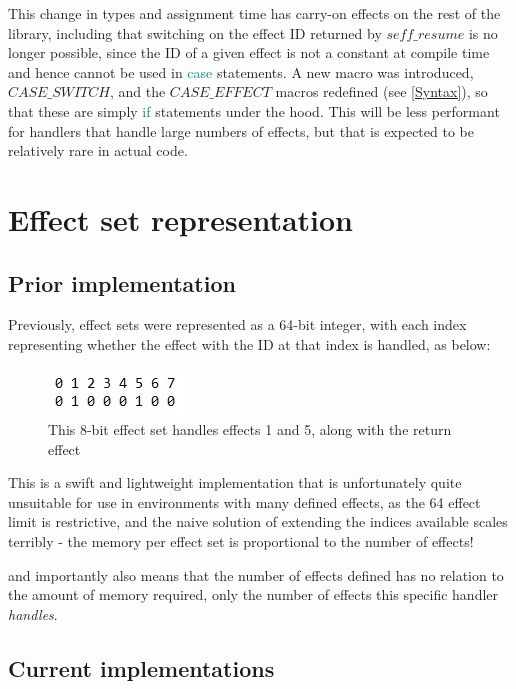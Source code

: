 \documentclass[logo,bsc,singlespacing,parskip,online]{infthesis}
\begin{document}
This change in types and assignment time has carry-on effects on the rest of the library, including that switching on the effect ID returned by $seff\_resume$ is no longer possible, since the ID of a given effect is not a constant at compile time and hence cannot be used in \textcolor{teal}{case} statements. A new macro was introduced, $CASE\_SWITCH$, and the $CASE\_EFFECT$ macros redefined (see \cref{Syntax}), so that these are simply \textcolor{teal}{if} statements under the hood. This will be less performant for handlers that handle large numbers of effects, but that is expected to be relatively rare in actual code.

\section{Effect set representation}

\subsection{Prior implementation}

Previously, effect sets were represented as a 64-bit integer, with each index representing whether the effect with the ID at that index is handled, as below:

\begin{figure}[ht]
    \centering
    \includegraphics[width=0.3\linewidth]{effect_set.png}
    \caption{This 8-bit effect set handles effects 1 and 5, along with the return effect}
\end{figure}

This is a swift and lightweight implementation that is unfortunately quite unsuitable for use in environments with many defined effects, as the 64 effect limit is restrictive, and the naive solution of extending the indices available scales terribly - the memory per effect set is proportional to the number of effects!


and importantly also means that the number of effects defined has no relation to the amount of memory required, only the number of effects this specific handler \textit{handles}.

\subsection{Current implementations} \label{impls_here}
\end{document}

